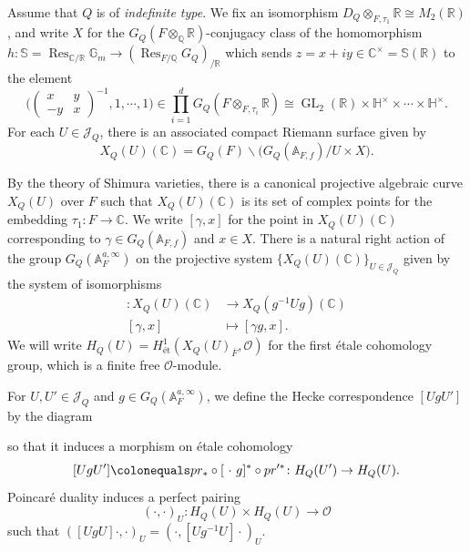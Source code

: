 \documentclass[a4paper, notitlepage, 10pt]{amsart}
\theoremstyle{plain} %
\theoremstyle{definition} %
\theoremstyle{remark} %
\numberwithin{equation}{section}
\newcommand{\bbA}{\mathbb A}
\newcommand{\bbC}{\mathbb C}
\newcommand{\bbH}{\mathbb H}
\newcommand{\bbR}{\mathbb R}
\newcommand{\GL}{\operatorname{GL}} %
\newcommand{\Res}{\operatorname{\mathrm{Res}}} %
\begin{document}
\subsubsection{}\label{indefinitesetting} Assume that $Q$ is of \emph{indefinite type}. We fix an isomorphism $D_Q\otimes_{F,\tau_1}\mathbb{R}\cong M_2(\mathbb{R})$, and write $X$ for the $G_Q(F\otimes_{\mathbb{Q}}\mathbb{R})$-conjugacy class of the homomorphism $h: \mathbb{S}= \Res_{\mathbb{C}/\mathbb{R}} \mathbb{G}_m\rightarrow (\Res_{F/\mathbb{Q}} G_Q)_{/\mathbb{R}} $ which sends $z=x+iy\in \mathbb{C}^\times=\mathbb{S}(\mathbb{R})$ to the element
$$ \Big(\left(\begin{smallmatrix}x & y \\ -y & x\end{smallmatrix}\right)^{-1}, 1,\cdots,1\Big)\in \prod_{i=1}^d G_Q(F\otimes_{F,\tau_i}\mathbb{R})\cong \GL_2(\bbR)\times \bbH^\times \times \cdots \times \bbH^\times. $$
For each $U\in \mathcal{J}_Q$, there is an associated compact Riemann surface given by
$$ X_Q(U)(\mathbb{C})= G_Q(F)\backslash \big(G_Q(\mathbb{A}_{F,f})/U \times X \big).$$

By the theory of Shimura varieties, there is a canonical projective algebraic curve $X_Q(U)$ over $F$ such that $X_Q(U)(\mathbb{C})$ is its set of complex points for the embedding $\tau_1: F \rightarrow \mathbb{C}$. We write $[\gamma,x]$ for the point in $X_Q(U)(\bbC)$ corresponding to $\gamma\in G_Q(\mathbb{A}_{F,f})$ and $x\in X$. There is a natural right action of the group $G_Q(\mathbb{A}_F^{a,\infty})$ on the projective system $\{ X_Q(U)(\mathbb{C})\}_{U\in \mathcal{J}_Q}$ given by the system of isomorphisms
\begin{align*}
    [\ \cdot \ g]\colon X_Q(U)(\mathbb{C})&\rightarrow X_Q(g^{-1}Ug)(\mathbb{C})
    \\ [\gamma,x]&\mapsto [\gamma g,x].
\end{align*}
We will write $H_Q(U)=H^1_{\text{ét}}(X_Q(U)_{\overline{F}},\mathcal{O})$ for the first étale cohomology group, which is a finite free $\mathcal{O}$-module.

For $U,U'\in \mathcal{J}_Q$ and $g\in G_Q(\bbA_{F}^{a,\infty})$, we define the Hecke correspondence $[UgU']$ by the diagram
\begin{center}
\end{center}
so that it induces a morphism on étale cohomology
$$ [UgU']\colonequals pr_*\circ [\ \cdot \ g]^*\circ pr'^*\colon H_Q(U') \to H_Q(U). $$
Poincaré duality induces a perfect pairing 
\begin{equation}\label{PoincaréPairing}
    (\cdot,\cdot)_U \colon H_Q(U)\times H_Q(U)\longrightarrow \mathcal{O} 
\end{equation}
such that $([UgU]\cdot,\cdot)_U= (\cdot,[Ug^{-1}U]\cdot)_U$.
\end{document}
